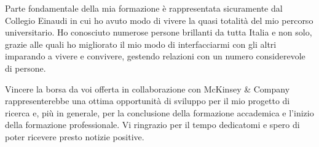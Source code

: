 \documentclass[11pt, a4paper]{awesome-cv}
\begin{document}
\begin{cvletter}
Parte fondamentale della mia formazione è rappresentata sicuramente dal Collegio Einaudi in cui ho avuto modo di vivere la quasi totalità del mio percorso universitario. Ho conosciuto numerose persone brillanti da tutta Italia e non solo, grazie alle quali ho migliorato il mio modo di interfacciarmi con gli altri imparando a vivere e convivere, gestendo relazioni con un numero considerevole di persone.

Vincere la borsa da voi offerta in collaborazione con McKinsey \& Company rappresenterebbe una ottima opportunità di sviluppo per il mio progetto di ricerca e, più in generale, per la conclusione della formazione accademica e l'inizio della formazione professionale.
Vi ringrazio per il tempo dedicatomi e spero di poter ricevere presto notizie positive.

\end{cvletter}


\makeletterclosing
\end{document}
